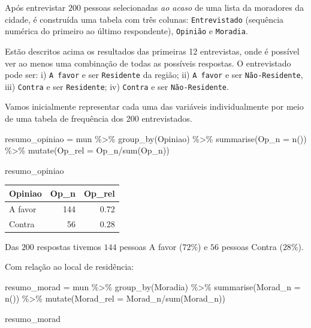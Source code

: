 \documentclass[
]{book}
\newenvironment{Shaded}{\begin{snugshade}}{\end{snugshade}}
\newcommand{\AttributeTok}[1]{\textcolor[rgb]{0.77,0.63,0.00}{#1}}
\newcommand{\FunctionTok}[1]{\textcolor[rgb]{0.00,0.00,0.00}{#1}}
\newcommand{\NormalTok}[1]{#1}
\newcommand{\OtherTok}[1]{\textcolor[rgb]{0.56,0.35,0.01}{#1}}
\newcommand{\SpecialCharTok}[1]{\textcolor[rgb]{0.00,0.00,0.00}{#1}}
\begin{document}
Após entrevistar \(200\) pessoas selecionadas \emph{ao acaso} de uma lista da moradores da cidade, é construída uma tabela com três colunas: \texttt{Entrevistado} (sequência numérica do primeiro ao último respondente), \texttt{Opinião} e \texttt{Moradia}.

Estão descritos acima os resultados das primeiras 12 entrevistas, onde é possível ver ao menos uma combinação de todas as possíveis respostas. O entrevistado pode ser: i) \texttt{A\ favor} e ser \texttt{Residente} da região; ii) \texttt{A\ favor} e ser \texttt{Não-Residente}, iii) \texttt{Contra} e ser \texttt{Residente}; iv) \texttt{Contra} e ser \texttt{Não-Residente}.

Vamos inicialmente representar cada uma das variáveis individualmente por meio de uma tabela de frequência dos 200 entrevistados.

\begin{Shaded}
\begin{Highlighting}[]
\NormalTok{resumo\_opiniao }\OtherTok{=}\NormalTok{ mun }\SpecialCharTok{\%\textgreater{}\%} 
  \FunctionTok{group\_by}\NormalTok{(Opiniao) }\SpecialCharTok{\%\textgreater{}\%} 
  \FunctionTok{summarise}\NormalTok{(}\AttributeTok{Op\_n =} \FunctionTok{n}\NormalTok{()) }\SpecialCharTok{\%\textgreater{}\%} 
  \FunctionTok{mutate}\NormalTok{(}\AttributeTok{Op\_rel =}\NormalTok{ Op\_n}\SpecialCharTok{/}\FunctionTok{sum}\NormalTok{(Op\_n))}

\NormalTok{resumo\_opiniao}
\end{Highlighting}
\end{Shaded}

\begin{tabular}{l|r|r}
\hline
Opiniao & Op\_n & Op\_rel\\
\hline
A favor & 144 & 0.72\\
\hline
Contra & 56 & 0.28\\
\hline
\end{tabular}

Das \(200\) respostas tivemos \(144\) pessoas A favor (\(72\%\)) e \(56\) pessoas Contra (\(28\%\)).

Com relação ao local de residência:

\begin{Shaded}
\begin{Highlighting}[]
\NormalTok{resumo\_morad }\OtherTok{=}\NormalTok{ mun }\SpecialCharTok{\%\textgreater{}\%} 
  \FunctionTok{group\_by}\NormalTok{(Moradia) }\SpecialCharTok{\%\textgreater{}\%} 
  \FunctionTok{summarise}\NormalTok{(}\AttributeTok{Morad\_n =} \FunctionTok{n}\NormalTok{()) }\SpecialCharTok{\%\textgreater{}\%} 
  \FunctionTok{mutate}\NormalTok{(}\AttributeTok{Morad\_rel =}\NormalTok{ Morad\_n}\SpecialCharTok{/}\FunctionTok{sum}\NormalTok{(Morad\_n))}

\NormalTok{resumo\_morad}
\end{Highlighting}
\end{Shaded}
\end{document}
